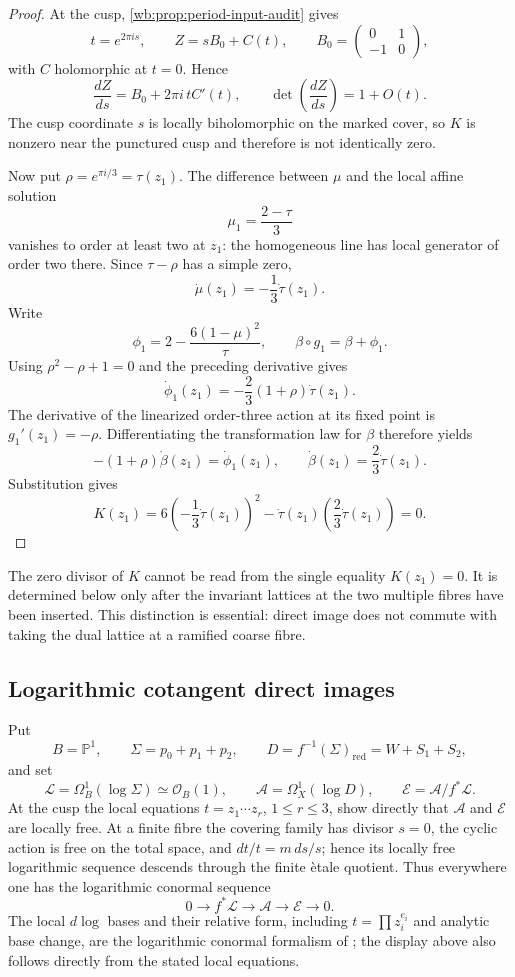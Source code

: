 \begin{proof}
At the cusp, \cref{wb:prop:period-input-audit} gives
\[
 t=e^{2\pi i s},\qquad Z=sB_0+C(t),\qquad
 B_0=\begin{pmatrix}0&1\\-1&0\end{pmatrix},
\]
with $C$ holomorphic at $t=0$.  Hence
\[
 \frac{dZ}{ds}=B_0+2\pi i\,tC'(t),
 \qquad
 \det\!\left(\frac{dZ}{ds}\right)=1+O(t).
\]
The cusp coordinate $s$ is locally biholomorphic on the marked cover, so
$K$ is nonzero near the punctured cusp and therefore is not identically
zero.

Now put $\rho=e^{\pi i/3}=\tau(z_1)$.  The difference between $\mu$ and
the local affine solution
\[
 \mu_1=\frac{2-\tau}{3}
\]
vanishes to order at least two at $z_1$: the homogeneous line has local
generator of order two there.  Since $\tau-\rho$ has a simple zero,
\[
 \dot\mu(z_1)=-\frac13\dot\tau(z_1).
\]
Write
\[
 \phi_1=2-\frac{6(1-\mu)^2}{\tau},
 \qquad \beta\circ g_1=\beta+\phi_1.
\]
Using $\rho^2-\rho+1=0$ and the preceding derivative gives
\[
 \dot\phi_1(z_1)
 =-\frac23(1+\rho)\dot\tau(z_1).
\]
The derivative of the linearized order-three action at its fixed point is
$g_1'(z_1)=-\rho$.  Differentiating the transformation law for $\beta$
therefore yields
\[
 -(1+\rho)\dot\beta(z_1)=\dot\phi_1(z_1),
 \qquad
 \dot\beta(z_1)=\frac23\dot\tau(z_1).
\]
Substitution gives
\[
 K(z_1)=6\left(-\frac13\dot\tau(z_1)\right)^2
 -\dot\tau(z_1)\left(\frac23\dot\tau(z_1)\right)=0.
\]
\end{proof}

The zero divisor of $K$ cannot be read from the single equality $K(z_1)=0$.
It is determined below only after the invariant lattices at the two multiple
fibres have been inserted.  This distinction is essential: direct image does
not commute with taking the dual lattice at a ramified coarse fibre.

\subsection{Logarithmic cotangent direct images}

Put
\[
 B=\mathbb P^1,\qquad
 \Sigma=p_0+p_1+p_2,\qquad
 D=f^{-1}(\Sigma)_{\mathrm{red}}=W+S_1+S_2,
\]
and set
\[
 \mathcal L=\Omega_B^1(\log\Sigma)\simeq\mathcal O_B(1),\qquad
 \mathcal A=\Omega_X^1(\log D),\qquad
 \mathcal E=\mathcal A/f^*\mathcal L.
\tag{WBH.11.1}\label{inv:wb:eq:11.1}
\]
At the cusp the local equations $t=z_1\cdots z_r$, $1\le r\le3$, show
directly that $\mathcal A$ and $\mathcal E$ are locally free.  At a finite
fibre the covering family has divisor $s=0$, the cyclic action is free on the
total space, and $dt/t=m\,ds/s$; hence its locally free logarithmic sequence
descends through the finite \`etale quotient.  Thus everywhere one has the
logarithmic conormal sequence
\[
 0\longrightarrow f^*\mathcal L\longrightarrow\mathcal A
 \longrightarrow\mathcal E\longrightarrow0.
\tag{WBH.11.2}\label{inv:wb:eq:11.2}
\]
The local $d\log$ bases and their relative form, including
$t=\prod z_i^{e_i}$ and analytic base change, are the logarithmic conormal
formalism of \cite[Chapter~II, \S3.2--3.3, pp.~72--75]{Deligne1970}; the
display above also follows directly from the stated local equations.

